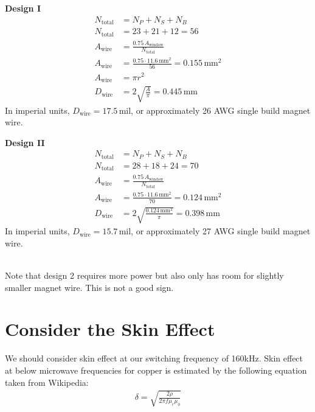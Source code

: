 \documentclass{article}
\begin{document}
\begin{minipage}[t]{0.45\linewidth}
    \textbf{Design I}
    \begin{align*}
    N_\text{total} &= N_P + N_S + N_B \\
    N_\text{total} &= 23 + 21 + 12 = 56 \\
    A_\text{wire} &= \frac{0.75 \, A_\text{window}}{N_\text{total}} \\
    A_\text{wire} &= \frac{0.75 \cdot 11.6 \, \text{mm}^2}{56} = 0.155 \, \text{mm}^2 \\
    A_\text{wire} &= \pi r^2 \\ 
    D_\text{wire} &= 2\sqrt{\frac{A}{\pi}} = 0.445 \, \text{mm}
    \end{align*}
    In imperial units, \(D_\text{wire} = 17.5 \, \text{mil}\), or approximately 26 AWG single build magnet wire.
\end{minipage}
\begin{minipage}[t]{0.45\linewidth}
    \textbf{Design II}
    \begin{align*}
    N_\text{total} &= N_P + N_S + N_B \\
    N_\text{total} &= 28 + 18 + 24 = 70 \\
    A_\text{wire} &= \frac{0.75 \, A_\text{window}}{N_\text{total}} \\
    A_\text{wire} &= \frac{0.75 \cdot 11.6 \, \text{mm}^2}{70} = 0.124 \, \text{mm}^2 \\
    D_\text{wire} &= 2\sqrt{\frac{0.124 \, \text{mm}^2}{\pi}} = 0.398 \, \text{mm}
    \end{align*}
    In imperial units, \(D_\text{wire} = 15.7 \, \text{mil}\), or approximately 27 AWG single build magnet wire.
\end{minipage} \\

Note that design 2 requires more power but also only has room for slightly smaller magnet wire.  This is not a good sign.

\section{Consider the Skin Effect}
We should consider skin effect at our switching frequency of 160kHz.
Skin effect at below microwave frequencies for copper is estimated by the following equation taken from Wikipedia:
\begin{align}
\delta = \sqrt{\frac{2 \rho}{2 \pi f \mu_r \mu_0}}
\end{align}
\end{document}
